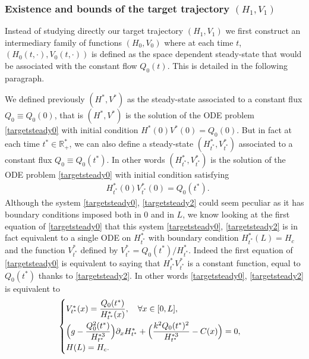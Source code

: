 \documentclass[JEP,XML,SOM,Unicode]{cedram}
\theoremstyle{definition}
\begin{document}
\subsubsection*{Existence and bounds of the target trajectory $(H_{1},V_{1})$}

Instead of studying directly our target trajectory $(H_{1},V_{1})$ we first construct an intermediary family of functions
$(H_{0},V_{0})$ where at each time $t$, $(H_{0}(t,\cdot),V_{0}(t,\cdot))$ is defined as the space dependent steady-state that would be associated with the constant flow $Q_{0}(t)$. This is detailed in the following paragraph.

We defined previously $(H^{*}, V^{*})$ as the steady-state associated to a constant flux $Q_{0}\equiv Q_{0}(0)$, {that is} $(H^{*},V^{*})$ is the solution of the ODE problem \eqref{targetsteady0} with
initial condition $H^{*}(0)V^{*}(0)=Q_{0}(0)$. But in fact
at each time $t^{*}\in\mathbb{R}^{*}_{+}$, we can also define a steady-state $(H^{*}_{t^{*}},V^{*}_{t^{*}})$ associated to a constant flux $Q_{0}\equiv Q_{0}(t^{*})$. {In other words}
$(H^{*}_{t^{*}},V^{*}_{t^{*}})$ is the solution of the ODE problem \eqref{targetsteady0}
with initial condition satisfying
\begin{equation}
\begin{split}
&H_{t^{*}}^{*}(0)V_{t^{*}}^{*}(0)=Q_{0}(t^{*}).
\end{split}
\label{targetsteady2}
\end{equation}
Although the system \eqref{targetsteady0}, \eqref{targetsteady2} could seem peculiar as it has boundary conditions imposed both in $0$ and in $L$,
we know looking at the first equation of \eqref{targetsteady0} that this system \eqref{targetsteady0}, \eqref{targetsteady2} is in fact equivalent to a single ODE on $H_{t^{*}}^{*}$
with boundary condition $H_{t^{*}}^{*}(L)=H_{c}$ and the function $V_{t^{*}}^{*}$ defined by $V_{t^{*}}^{*}=Q_{0}(t^{*})/H_{t^{*}}^{*}$. Indeed the first equation of \eqref{targetsteady0} is equivalent to saying that $H_{t^{*}}^{*}V_{t^{*}}^{*}$ is a constant function, equal to $Q_{0}(t^{*})$ thanks to \eqref{targetsteady2}. In other words \eqref{targetsteady0}, \eqref{targetsteady2} is equivalent to
\begin{equation*}
\begin{cases}
V_{t^{*}}^{*}(x)=\dfrac{Q_{0}(t^{*})}{H_{t^{*}}^{*}(x)},\quad\forall x\in[0,L],\\[8pt]
\Bigl(g-\dfrac{Q_{0}^{2}(t^{*})}{H_{t^{*}}^{*3}} \Bigr)\partial_{x}H_{t^{*}}^{*}+ \Bigl(\dfrac{k^{2}Q_{0}(t^{*})^{2}}{H_{t^{*}}^{*3}}-C(x) \Bigr)=0,\\[5pt]
H(L)=H_{c}.
\end{cases}
\end{equation*}
\end{document}
